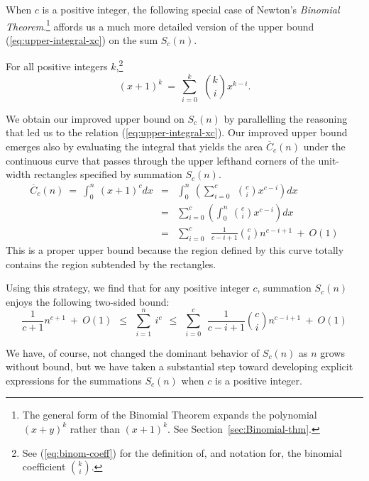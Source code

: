 When $c$ is a positive integer, the following special case of Newton's
{\it Binomial Theorem}.\footnote{The general form of the Binomial
  Theorem expands the polynomial $(x+y)^k$ rather than $(x+1)^k$.  See
Section~\ref{sec:Binomial-thm}.}
affords us a much more detailed version of the upper bound
(\ref{eq:upper-integral-xc})
on the sum $S_c(n)$.

\begin{theorem}
\label{thm:restricted-binomial-thm}
For all positive integers $k$,\footnote{See (\ref{eq:binom-coeff}) for
  the definition of, and notation for, the binomial coefficient
  $\displaystyle {k \choose i}$.}
\begin{equation}
\label{eq:restricted-binomial-thm}
(x+1)^k \ = \ \sum_{i=0}^k \ \ {k \choose i} x^{k-i}.
\end{equation}
\end{theorem}

We obtain our improved upper bound on $S_c(n)$ by parallelling the
reasoning that led us to the relation (\ref{eq:upper-integral-xc}).
Our improved upper bound emerges also by evaluating the integral that
yields the area $\overline{C}_c(n)$ under the continuous curve that
passes through the upper lefthand corners of the unit-width rectangles
specified by summation $S_c(n)$.
\begin{eqnarray}
\label{eq:upper-integral-xk}
\overline{C}_c(n) \ = \
\int_0^n \ (x+1)^c dx & = &
\int_0^n \ \left(\sum_{i=0}^c \ \ {c \choose i} x^{c-i} \right) dx \\
\nonumber
& = &
\sum_{i=0}^c \left( \int_0^n \  {c \choose i} x^{c-i} \right) dx \\
\nonumber
  & = &
\sum_{i=0}^c \ \ \frac{1}{c-i+1} {c \choose i} n^{c-i+1} \ + \ O(1)
\end{eqnarray}
This is a proper upper bound because the region defined by this curve
totally contains the region subtended by the rectangles.

\noindent
Using this strategy, we find that for any positive integer $c$,
summation $S_c(n)$ enjoys the following two-sided bound:
\begin{equation}
\label{eq:bounds-sum-xk}
\frac{1}{c+1} n^{c+1} \ + \ O(1)
  \ \ \leq \ \ \sum_{i=1}^n \ i^c
  \ \ \leq \ \ 
\sum_{i=0}^c \ \ \frac{1}{c-i+1} {c \choose i} n^{c-i+1} \ + \ O(1)
\end{equation}

We have, of course, not changed the dominant behavior of $S_c(n)$ as
$n$ grows without bound, but we have taken a substantial step toward
developing explicit expressions for the summations $S_c(n)$ when $c$
is a positive integer.

